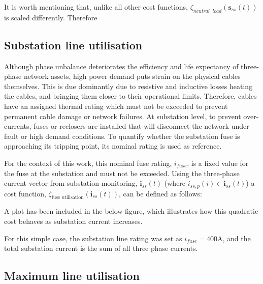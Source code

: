 

It is worth mentioning that, unlike all other cost functions, $\zeta_{neutral\;\;load}(\textbf{s}_{ss}(t))$ is scaled differently.
Therefore 

\subsection{Substation line utilisation}
\label{ch1:subsec:substation-line-utilisation}

Although phase unbalance deteriorates the efficiency and life expectancy of three-phase network assets, high power demand puts strain on the physical cables themselves.
This is due dominantly due to resistive and inductive losses heating the cables, and bringing them closer to their operational limits.
Therefore, cables have an assigned thermal rating which must not be exceeded to prevent permanent cable damage or network failures.
At substation level, to prevent over-currents, fuses or reclosers are installed that will disconnect the network under fault or high demand conditions.
To quantify whether the substation fuse is approaching its tripping point, its nominal rating is used as reference.

For the context of this work, this nominal fuse rating, $i_{fuse}$, is a fixed value for the fuse at the substation and must not be exceeded.
Using the three-phase current vector from substation monitoring, $\textbf{i}_{ss}(t)$ (where $i_{ss,p}(i) \in \textbf{i}_{ss}(t)$) a cost function, $\zeta_\text{fuse utilisation}(\textbf{i}_{ss}(t))$, can be defined as follows:



A plot has been included in the below figure, which illustrates how this quadratic cost behaves as substation current increases.



For this simple case, the substation line rating was set as $i_{fuse}=400\text{A}$, and the total substation current is the sum of all three phase currents.

\subsection{Maximum line utilisation}
\label{ch1:subsec:maximum-line-utilisation}

